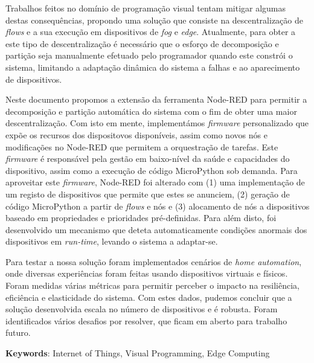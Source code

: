 Trabalhos feitos no domínio de programação visual tentam mitigar algumas destas consequências, propondo uma solução que consiste na descentralização de \emph{flows} e a sua execução em dispositivos de \emph{fog} e \emph{edge}. Atualmente, para obter a este tipo de descentralização é necessário que o esforço de decomposição e partição seja manualmente efetuado pelo programador quando este constrói o sistema, limitando a adaptação dinâmica do sistema a falhas e ao aparecimento de dispositivos.

Neste documento propomos a extensão da ferramenta Node-RED para permitir a decomposição e partição automática do sistema com o fim de obter uma maior descentralização. Com isto em mente, implementámos \textit{firmware} personalizado que expõe os recursos dos dispositovos disponíveis, assim como novos nós e modificações no Node-RED que permitem a orquestração de tarefas. Este \textit{firmware} é responsável pela gestão em baixo-nível da saúde e capacidades do dispositivo, assim como a execução de código MicroPython sob demanda. Para aproveitar este \textit{firmware}, Node-RED foi alterado com (1) uma implementação de um registo de dispositivos que permite que estes se anunciem, (2) geração de código MicroPython a partir de \textit{flows} e nós e (3) alocamento de nós a dispositivos baseado em propriedades e prioridades pré-definidas. Para além disto, foi desenvolvido um mecanismo que deteta automaticamente condições anormais dos dispositivos em \emph{run-time}, levando o sistema a adaptar-se.

Para testar a nossa solução foram implementados cenários de \textit{home automation}, onde diversas experiências foram feitas usando dispositivos virtuais e físicos. Foram medidas várias métricas para permitir perceber o impacto na resiliência, eficiência e elasticidade do sistema. Com estes dados, pudemos concluir que a solução desenvolvida escala no número de dispositivos e é robusta. Foram identificados vários desafios por resolver, que ficam em aberto para trabalho futuro.

\vspace*{10mm}\noindent

\textbf{Keywords}: Internet of Things, Visual Programming, Edge Computing
